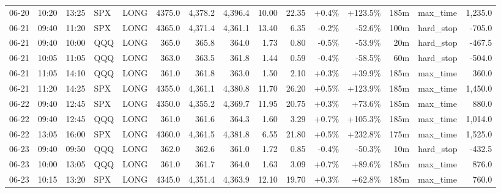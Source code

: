 \documentclass[11pt,a4paper,twoside]{article}
\begin{document}
\begin{landscape}
\begin{center}
\begin{longtable}{>{\color{txtmain}}l l l l l r r r r r r r r >{\color{txtmain}}l r}
06-20 & 10:20 & 13:25 & SPX & LONG & 4375.0 & 4,378.2 & 4,396.4 & 10.00 & 22.35 & \textcolor{wingreen}{+0.4\%} & \textcolor{wingreen}{+123.5\%} & 185m & max\_time & \textcolor{wingreen}{1,235.0} \\
06-21 & 09:40 & 11:20 & SPX & LONG & 4365.0 & 4,371.4 & 4,361.1 & 13.40 & 6.35 & \textcolor{lossred}{-0.2\%} & \textcolor{lossred}{-52.6\%} & 100m & hard\_stop & \textcolor{lossred}{-705.0} \\
06-21 & 09:40 & 10:00 & QQQ & LONG & 365.0 & 365.8 & 364.0 & 1.73 & 0.80 & \textcolor{lossred}{-0.5\%} & \textcolor{lossred}{-53.9\%} & 20m & hard\_stop & \textcolor{lossred}{-467.5} \\
06-21 & 10:05 & 11:05 & QQQ & LONG & 363.0 & 363.5 & 361.8 & 1.44 & 0.59 & \textcolor{lossred}{-0.4\%} & \textcolor{lossred}{-58.5\%} & 60m & hard\_stop & \textcolor{lossred}{-504.0} \\
06-21 & 11:05 & 14:10 & QQQ & LONG & 361.0 & 361.8 & 363.0 & 1.50 & 2.10 & \textcolor{wingreen}{+0.3\%} & \textcolor{wingreen}{+39.9\%} & 185m & max\_time & \textcolor{wingreen}{360.0} \\
06-21 & 11:20 & 14:25 & SPX & LONG & 4355.0 & 4,361.1 & 4,380.8 & 11.70 & 26.20 & \textcolor{wingreen}{+0.5\%} & \textcolor{wingreen}{+123.9\%} & 185m & max\_time & \textcolor{wingreen}{1,450.0} \\
06-22 & 09:40 & 12:45 & SPX & LONG & 4350.0 & 4,355.2 & 4,369.7 & 11.95 & 20.75 & \textcolor{wingreen}{+0.3\%} & \textcolor{wingreen}{+73.6\%} & 185m & max\_time & \textcolor{wingreen}{880.0} \\
06-22 & 09:40 & 12:45 & QQQ & LONG & 361.0 & 361.6 & 364.3 & 1.60 & 3.29 & \textcolor{wingreen}{+0.7\%} & \textcolor{wingreen}{+105.3\%} & 185m & max\_time & \textcolor{wingreen}{1,014.0} \\
06-22 & 13:05 & 16:00 & SPX & LONG & 4360.0 & 4,361.5 & 4,381.8 & 6.55 & 21.80 & \textcolor{wingreen}{+0.5\%} & \textcolor{wingreen}{+232.8\%} & 175m & max\_time & \textcolor{wingreen}{1,525.0} \\
06-23 & 09:40 & 09:50 & QQQ & LONG & 362.0 & 362.6 & 361.0 & 1.72 & 0.85 & \textcolor{lossred}{-0.4\%} & \textcolor{lossred}{-50.3\%} & 10m & hard\_stop & \textcolor{lossred}{-432.5} \\
06-23 & 10:00 & 13:05 & QQQ & LONG & 361.0 & 361.7 & 364.0 & 1.63 & 3.09 & \textcolor{wingreen}{+0.7\%} & \textcolor{wingreen}{+89.6\%} & 185m & max\_time & \textcolor{wingreen}{876.0} \\
06-23 & 10:15 & 13:20 & SPX & LONG & 4345.0 & 4,351.4 & 4,363.9 & 12.10 & 19.70 & \textcolor{wingreen}{+0.3\%} & \textcolor{wingreen}{+62.8\%} & 185m & max\_time & \textcolor{wingreen}{760.0} \\

\end{longtable}
\end{center}
\end{landscape}
\end{document}
